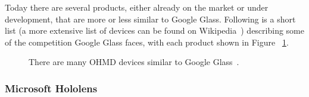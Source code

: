 Today there are several products, either already on the market or under development, that are more or less similar to Google Glass. Following is a short list (a more extensive list of devices can be found on Wikipedia~\cite{ohmdWiki}) describing some of the competition Google Glass faces, with each product shown in Figure ~\ref{imagesSimilarProducts}. 

	\begin{figure}[H]%
		\centering
    \qquad
    \qquad
    \qquad
    \qquad
		\caption{There are many OHMD devices similar to Google Glass~\cite{ohmdWiki}.}
		\label{imagesSimilarProducts}
	\end{figure}
	

\subsubsection{Microsoft Hololens}

